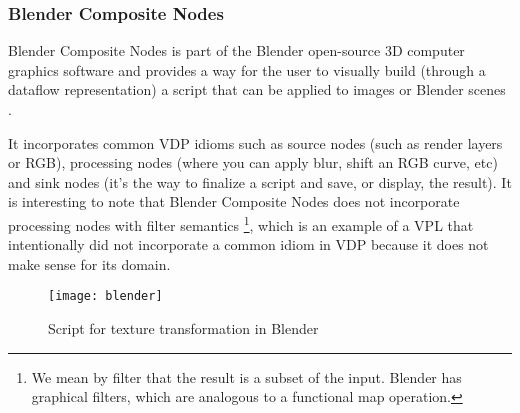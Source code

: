 \subsubsection{Blender Composite Nodes}

Blender Composite Nodes is part of the Blender open-source 3D computer graphics
software and provides a way for the user to visually build (through a dataflow
representation) a script that can be applied to images or Blender scenes \cite{blender}.

It incorporates common VDP idioms such as source nodes (such as render layers or
RGB), processing nodes (where you can apply blur, shift an RGB curve, etc) and
sink nodes (it's the way to finalize a script and save, or display, the result).
It is interesting to note that
Blender Composite Nodes does not incorporate processing nodes with filter semantics
\footnote{We mean by filter that the result is a subset of the input. Blender has
graphical filters, which are analogous to a functional map operation.},
which is an example of a VPL that intentionally did not incorporate a common
idiom in VDP because it does not make sense for its domain.

\begin{figure}[t]
  \begin{center}
    \leavevmode
    \texttt{[image: blender]}
    \caption{Script for texture transformation in Blender \cite{blender}}
    \label{fig:blender}
  \end{center}
\end{figure}

